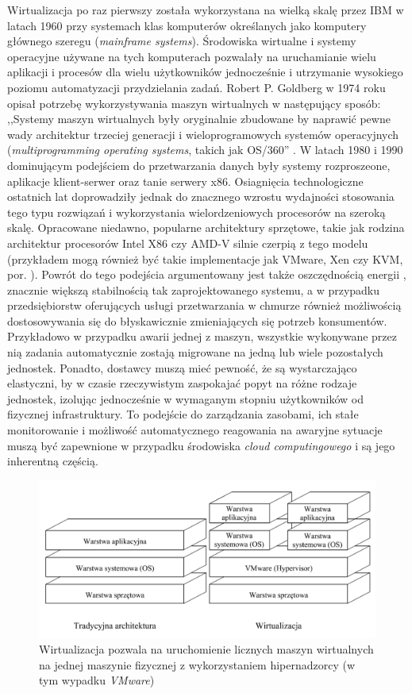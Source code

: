 \documentclass[12pt,a4paper,twoside]{article}
\begin{document}
Wirtualizacja po raz pierwszy została wykorzystana na wielką skalę przez IBM w latach 1960 przy systemach klas komputerów określanych jako komputery głównego szeregu (\textit{mainframe systems}). Środowiska wirtualne i systemy operacyjne używane na tych komputerach pozwalały na uruchamianie wielu aplikacji i procesów dla wielu użytkowników jednocześnie i utrzymanie wysokiego poziomu automatyzacji przydzielania zadań. Robert P. Goldberg w 1974 roku opisał potrzebę wykorzystywania maszyn wirtualnych w następujący sposób: ,,Systemy maszyn wirtualnych były oryginalnie zbudowane by naprawić pewne wady architektur trzeciej generacji i wieloprogramowych systemów operacyjnych (\textit{multiprogramming operating systems}, takich jak OS/360'' \citep{goldberg1974}. W latach 1980 i 1990 dominującym podejściem do przetwarzania danych były systemy rozproszeone, aplikacje klient-serwer oraz tanie serwery x86. Osiagnięcia technologiczne ostatnich lat doprowadziły jednak do znacznego wzrostu wydajności stosowania tego typu rozwiązań i wykorzystania wielordzeniowych procesorów na szeroką skalę. Opracowane niedawno, popularne architektury sprzętowe, takie jak rodzina architektur procesorów Intel X86 czy AMD-V silnie czerpią z tego modelu (przykładem mogą również być takie implementacje jak VMware, Xen czy KVM, por. \citet{shroff2010}). Powrót do tego podejścia argumentowany jest także oszczędnością energii \citep{ward2013}, znacznie większą stabilnością tak zaprojektowanego systemu, a w przypadku przedsiębiorstw oferujących usługi przetwarzania w chmurze również możliwością dostosowywania się do błyskawicznie zmieniających się potrzeb konsumentów. Przykładowo w przypadku awarii jednej z maszyn, wszystkie wykonywane przez nią zadania automatycznie zostają migrowane na jedną lub wiele pozostałych jednostek. Ponadto, dostawcy muszą mieć pewność, że są wystarczająco elastyczni, by w czasie rzeczywistym zaspokajać popyt na różne rodzaje jednostek, izolując jednocześnie w wymaganym stopniu użytkowników od fizycznej infrastruktury. To podejście do zarządzania zasobami, ich stałe monitorowanie i możliwość automatycznego reagowania na awaryjne sytuacje muszą być zapewnione w przypadku środowiska \textit{cloud computingowego} i są jego inherentną częścią.

\begin{figure}[h]
  \centering
\includegraphics[scale=0.8]{../obrazy/fig:vm.png}
\caption{Wirtualizacja pozwala na uruchomienie licznych maszyn wirtualnych na jednej maszynie fizycznej z wykorzystaniem hipernadzorcy (w tym wypadku \textit{VMware}) \label{fig:vm}}
\end{figure}
\end{document}
